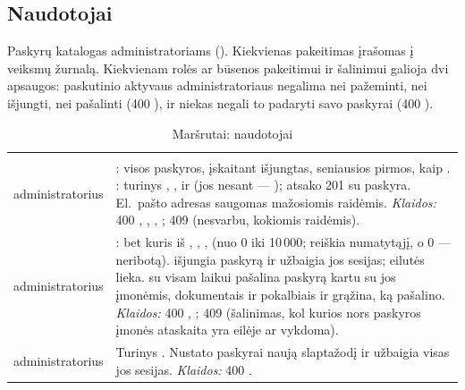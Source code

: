\subsection{Naudotojai}\label{sec:api:users}

Paskyrų katalogas administratoriams (). Kiekvienas pakeitimas
įrašomas į veiksmų žurnalą. Kiekvienam rolės ar būsenos pakeitimui ir šalinimui galioja dvi
apsaugos: paskutinio aktyvaus administratoriaus negalima nei pažeminti, nei išjungti, nei pašalinti
(400 ), ir niekas negali to padaryti savo paskyrai (400 ).

\begin{xltabular}{\textwidth}{@{}L{19mm}Y@{}}
\caption{Maršrutai: naudotojai}\label{tab:api:users}\\
\toprule {} &  \\ \midrule \endfirsthead
\toprule {} &  \\ \midrule \endhead
\bottomrule \endlastfoot
{}
administratorius & : visos paskyros, įskaitant išjungtas, seniausios pirmos, kaip
  . : turinys , ,  ir
   (jos nesant --- ); atsako 201 su paskyra. El.~pašto adresas saugomas
  mažosiomis raidėmis. \emph{Klaidos:} 400 , ,
  , ; 409  (nesvarbu, kokiomis raidėmis). \\
\addlinespace
{}
administratorius & : bet kuris iš , , ,
   (nuo 0 iki 10\,000;  reiškia numatytąjį, o 0 --- neribotą).
   išjungia paskyrą ir užbaigia jos sesijas; eilutės lieka.  su
   visam laikui pašalina paskyrą kartu su jos įmonėmis, dokumentais ir
  pokalbiais ir grąžina, ką pašalino. \emph{Klaidos:} 400 ,
  ; 409  (šalinimas, kol kurios nors paskyros įmonės
  ataskaita yra eilėje ar vykdoma). \\
\addlinespace
{}
administratorius & Turinys . Nustato paskyrai naują slaptažodį ir užbaigia visas
  jos sesijas. \emph{Klaidos:} 400 . \\
\end{xltabular}

